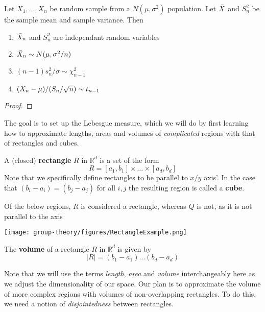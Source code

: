 
\begin{theorem}
    Let $X_1, \dots, X_n$ be random sample from a $N(\mu, \sigma^2)$ population. Let $\Bar{X}$ and $S_n^2$ be the sample mean and sample variance. Then
    \begin{enumerate}
        \item $\Bar{X}_n$ and $S_n^2$ are independant random variables
        \item $\Bar{X}_n \sim N(\mu, \sigma^2/n)$
        \item $(n-1)s^2_n/\sigma \sim \chi^2_{n-1}$
        \item $(\Bar{X}_n - \mu)/(S_n / \sqrt{n})\sim t_{n-1}$
    \end{enumerate}
\end{theorem}
\begin{proof}
    
\end{proof}


The goal is to set up the Lebesgue measure, which we will do by first learning how to approximate lengths, areas and volumes of \textit{complicated} regions with that of rectangles and cubes.  
\begin{definition}
    A (closed) \textbf{rectangle} $R$ in $\mathbb{R}^d$ is a set of the form 
    $$R = [a_1, b_1] \times \dots \times [a_d, b_d]$$
    Note that we specifically define rectangles to be parallel to $x/y$ axis'. In the case that $(b_i - a_i) = (b_j - a_j)$ for all $i,j$ the resulting region is called a \textbf{cube}. 
\end{definition}

\begin{eg}[Rectangles]
    Of the below regions, $R$ is considered a rectangle, whereas $Q$ is not, as it is not parallel to the axis
\end{eg}
    \begin{center}
        \texttt{[image: group-theory/figures/RectangleExample.png]}
    \end{center}


\begin{definition}
    The \textbf{volume} of a rectangle $R$ in $\mathbb{R}^d$ is given by 
    $$|R| = (b_1 - a_1)\hdots(b_d - a_d)$$
\end{definition}

Note that we will use the terms \textit{length}, \textit{area} and \textit{volume} interchangeably here as we adjust the dimensionality of our space.
Our plan is to approximate the volume of more complex regions with volumes of non-overlapping rectangles. To do this, we need a notion of \textit{disjointedness} between rectangles. 

